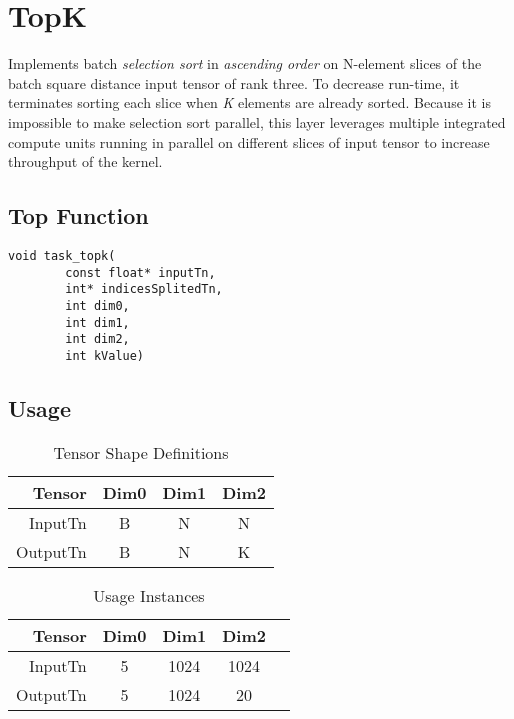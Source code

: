 \documentclass[•]{article}
\begin{document}
\pagebreak












\section{TopK}
Implements batch \emph{selection sort} in \emph{ascending order} on N-element slices of the batch square distance input tensor of rank three. To decrease run-time, it terminates sorting each slice when \emph{K} elements are already sorted. Because it is impossible to make selection sort parallel, this layer leverages multiple integrated compute units running in parallel on different slices of input tensor to increase throughput of the kernel. 

\subsection{Top Function}
\begin{lstlisting}
void task_topk(
		const float* inputTn,
		int* indicesSplitedTn,
		int dim0,
		int dim1,
		int dim2,
		int kValue)
\end{lstlisting}

\subsection{Usage}
\begin{table}[htbp] %
\caption{Tensor Shape Definitions}
\label{tab:shapes_concat}
	\begin{center}
		\begin{tabular}{|r|c|c|c|} 
		\hline	
		Tensor & Dim0 & Dim1 & Dim2 \\ 
		\hline	
		InputTn &
			B &
			N &
			N\\ 
		\hline	
		OutputTn &
			B & 
			N & 
			K \\
		\hline
		\end{tabular}
	\end{center}
\end{table}

\begin{table}[htbp] %
\caption{Usage Instances}
\label{tab:shapes_transpose}
	\begin{center}
		\begin{tabular}{|r|c|c|c|c|} 
		\hline	
		Tensor & Dim0 & Dim1 & Dim2 \\ 
		\hline	
		InputTn &
			5 &
			1024 &
			1024 \\ 
		\hline
		OutputTn &
			5 &
			1024 & 
			20\\ 
		\hline
		\end{tabular}
	\end{center}
\end{table}
\end{document}
